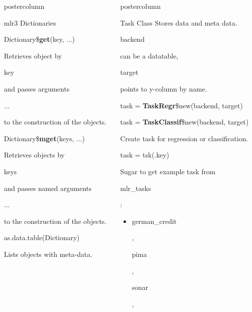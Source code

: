 \documentclass{beamer}
\newlength{\columnheight} %
\newcommand{\codeinline}[1]{\begin{codeboxinline}#1\end{codeboxinline}}
\begin{document}
\begin{frame}[fragile]{}
\begin{columns}
\begin{column}{.245\textwidth}
\begin{beamercolorbox}[center]{postercolumn}
\begin{minipage}{.98\textwidth}
{\begin{myblock}{mlr3 Dictionaries}
\begin{codebox}
								Dictionary\$\textbf{get}(key, ...)
							\end{codebox}
							Retrieves object by \codeinline{key} and 
							passes arguments \codeinline{...} to the construction of the objects.
							\\
							\begin{codebox}
								Dictionary\$\textbf{mget}(keys, ...)
							\end{codebox}
							Retrieves objects by \codeinline{keys} and 
							passes named arguments \codeinline{...} to the construction of the objects. 
							\\
							\begin{codebox}
								as.data.table(Dictionary)
							\end{codebox}
							Lists objects with meta-data.
						\end{myblock}
					\vfill}
				\end{minipage}
			\end{beamercolorbox}
		\end{column}
		\begin{column}{.245\textwidth}
			\begin{beamercolorbox}[center]{postercolumn}
				\begin{minipage}{.98\textwidth}
					\parbox[t][\columnheight]{\textwidth}{
						\begin{myblock}{Task Class}
							Stores data and meta data. \codeinline{backend} can be a datatable, 
                            \codeinline{target} points to y-column by name.
							\\
							\begin{codebox}
								task = \textbf{TaskRegr}\$new(backend, target) 
							\end{codebox}
							\begin{codebox}
								task = \textbf{TaskClassif}\$new(backend, target) 
							\end{codebox}
                            Create task for regression or classification.
                            \\
							\begin{codebox}
                                task = tsk(.key)
							\end{codebox}
                            Sugar to get example task from \codeinline{mlr\_tasks}:
                            \begin{itemize}
								\item \codeinline{german\_credit}, \codeinline{pima}, \codeinline{sonar},

\end{itemize}
\end{myblock}}
\end{minipage}
\end{beamercolorbox}
\end{column}
\end{columns}
\end{frame}
\end{document}
